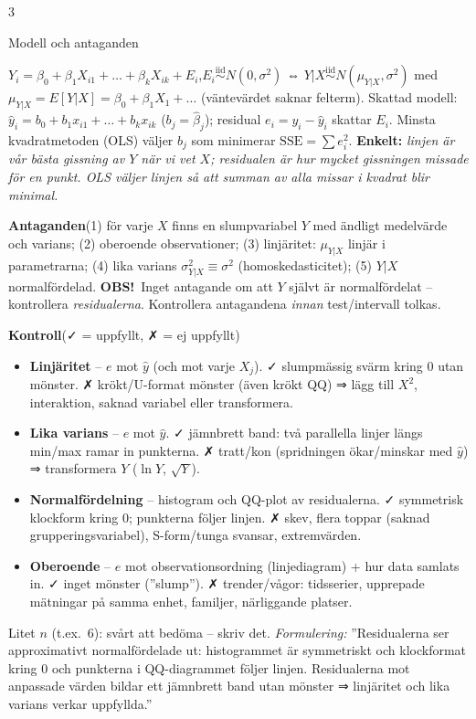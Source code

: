 \documentclass[8pt]{extarticle}
\makeatletter
\newcounter{sect}
\newcommand{\sect}[3][hd]{\par\vspace{1.5pt}\refstepcounter{sect}\noindent
  {\setlength{\fboxsep}{1.8pt}\colorbox{#1}{\parbox{\dimexpr\linewidth-2\fboxsep}{\color{white}\sffamily\bfseries
  \strut\thesect\enspace #2}}}\label{#3}\par\nobreak\vspace{0.8pt}\@afterheading}
\newcommand{\sub}[1]{{\color{hd}\sffamily\bfseries #1}\enspace}
\newcommand{\obs}{{\color{BrickRed}\sffamily\bfseries OBS!}\ }
\newcommand{\enk}[1]{{\color{cEnk}\sffamily\bfseries Enkelt:} {\itshape #1}}
\newcommand{\SSE}{\mathrm{SSE}}
\newcommand{\iid}{\overset{\text{iid}}{\sim}}
\makeatother
\begin{document}
\begin{multicols*}{3}
\sect[cGrund]{Modell och antaganden}{sec:modell}
$Y_i=\beta_0+\beta_1X_{i1}+\dots+\beta_kX_{ik}+E_i$,\quad $E_i\iid N(0,\sigma^2)$
\;⇔\; $Y|X\iid N(\mu_{Y|X},\sigma^2)$ med $\mu_{Y|X}=E[Y|X]=\beta_0+\beta_1X_1+\dots$ (väntevärdet saknar felterm).
Skattad modell: $\hat y_i=b_0+b_1x_{i1}+\dots+b_kx_{ik}$ ($b_j=\hat\beta_j$); residual $e_i=y_i-\hat y_i$ skattar $E_i$.
Minsta kvadratmetoden (OLS) väljer $b_j$ som minimerar $\SSE=\sum e_i^2$. \enk{linjen är vår bästa gissning av $Y$ när vi vet $X$; residualen är hur mycket gissningen missade för en punkt. OLS väljer linjen så att summan av alla missar i kvadrat blir minimal.}

\sub{Antaganden}(1) för varje $X$ finns en slumpvariabel $Y$ med ändligt medelvärde och varians; (2) oberoende observationer; (3) linjäritet: $\mu_{Y|X}$ linjär i parametrarna; (4) lika varians $\sigma^2_{Y|X}\equiv\sigma^2$ (homoskedasticitet); (5) $Y|X$ normalfördelad.
\obs Inget antagande om att $Y$ självt är normalfördelat – kontrollera \emph{residualerna}. Kontrollera antagandena \emph{innan} test/intervall tolkas.

\sub{Kontroll}(✓ = uppfyllt, ✗ = ej uppfyllt)
\begin{itemize}
\item \textbf{Linjäritet} – $e$ mot $\hat y$ (och mot varje $X_j$). ✓ slumpmässig svärm kring 0 utan mönster. ✗ krökt/U-format mönster (även krökt QQ) ⇒ lägg till $X^2$, interaktion, saknad variabel eller transformera.
\item \textbf{Lika varians} – $e$ mot $\hat y$. ✓ jämnbrett band: två parallella linjer längs min/max ramar in punkterna. ✗ tratt/kon (spridningen ökar/minskar med $\hat y$) ⇒ transformera $Y$ ($\ln Y$, $\sqrt Y$).
\item \textbf{Normalfördelning} – histogram och QQ-plot av residualerna. ✓ symmetrisk klockform kring 0; punkterna följer linjen. ✗ skev, flera toppar (saknad grupperingsvariabel), S-form/tunga svansar, extremvärden.
\item \textbf{Oberoende} – $e$ mot observationsordning (linjediagram) + hur data samlats in. ✓ inget mönster (”slump”). ✗ trender/vågor: tidsserier, upprepade mätningar på samma enhet, familjer, närliggande platser.
\end{itemize}
Litet $n$ (t.ex.\ 6): svårt att bedöma – skriv det. \emph{Formulering:} ”Residualerna ser approximativt normalfördelade ut: histogrammet är symmetriskt och klockformat kring 0 och punkterna i QQ-diagrammet följer linjen. Residualerna mot anpassade värden bildar ett jämnbrett band utan mönster ⇒ linjäritet och lika varians verkar uppfyllda.”


\end{multicols*}
\end{document}
